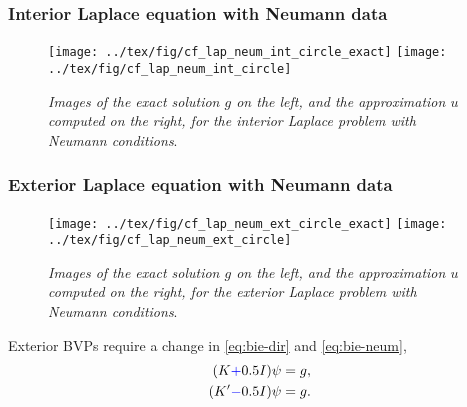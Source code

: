 \documentclass[handout]{beamer}
\begin{document}
\begin{frame}
 \frametitle{Interior Laplace equation with Neumann data}
 \begin{center}
\begin{figure}
{
\texttt{[image: ../tex/fig/cf\_lap\_neum\_int\_circle\_exact]}
}
{
\texttt{[image: ../tex/fig/cf\_lap\_neum\_int\_circle]}
}
\caption{\emph{Images of the exact solution $g$ on the left, and the approximation $u$ computed on the right,
for the interior Laplace problem with Neumann conditions}.}
\label{fig:cf_lap_neum_circle}
\end{figure}
\end{center}

\end{frame}
\begin{frame}
 \frametitle{Exterior Laplace equation with Neumann data}
\begin{center}
\begin{figure}
{
\texttt{[image: ../tex/fig/cf\_lap\_neum\_ext\_circle\_exact]}
}
{
\texttt{[image: ../tex/fig/cf\_lap\_neum\_ext\_circle]}
}
\caption{\emph{Images of the exact solution $g$ on the left, and the approximation $u$ computed on the right,
for the exterior Laplace problem with Neumann conditions}.}
\label{fig:cf_lap_neum_circle_ext}
\end{figure}
\end{center}
Exterior BVPs
require a change in 
\eqref{eq:bie-dir} and \eqref{eq:bie-neum}, 
\begin{align}
 (K {\color{blue}+} 0.5 I)\psi &= g,\label{eq:bie-dir-ext}\\
 (K' {\color{blue}-} 0.5 I)\psi &= g.\label{eq:bie-neum-ext}
\end{align}
\end{frame}
\end{document}
